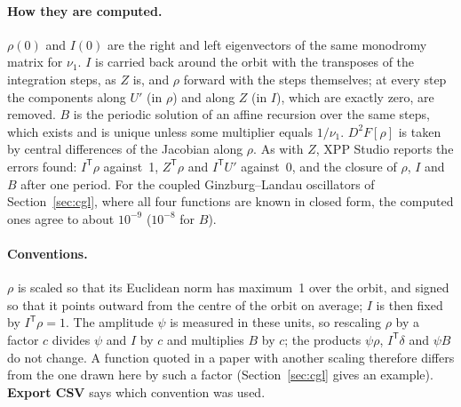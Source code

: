 \documentclass[11pt,a4paper]{article}
\newcommand{\XS}{\textsf{XPP Studio}}
\newcommand{\ui}[1]{\textsf{\textbf{#1}}}          %
\begin{document}
\paragraph{How they are computed.} $\rho(0)$ and $I(0)$ are the right and left eigenvectors of the same monodromy matrix for $\nu_1$. $I$ is carried back around the orbit with the transposes of the integration steps, as $Z$ is, and $\rho$ forward with the steps themselves; at every step the components along $U'$ (in $\rho$) and along $Z$ (in $I$), which are exactly zero, are removed. $B$ is the periodic solution of an affine recursion over the same steps, which exists and is unique unless some multiplier equals $1/\nu_1$. $D^2F[\rho]$ is taken by central differences of the Jacobian along $\rho$. As with $Z$, \XS{} reports the errors found: $I^{\mathsf T}\rho$ against~1, $Z^{\mathsf T}\rho$ and $I^{\mathsf T}U'$ against~0, and the closure of $\rho$, $I$ and $B$ after one period. For the coupled Ginzburg--Landau oscillators of Section~\ref{sec:cgl}, where all four functions are known in closed form, the computed ones agree to about $10^{-9}$ ($10^{-8}$ for $B$).

\paragraph{Conventions.} $\rho$ is scaled so that its Euclidean norm has maximum~1 over the orbit, and signed so that it points outward from the centre of the orbit on average; $I$ is then fixed by $I^{\mathsf T}\rho=1$. The amplitude $\psi$ is measured in these units, so rescaling $\rho$ by a factor $c$ divides $\psi$ and $I$ by $c$ and multiplies $B$ by $c$; the products $\psi\rho$, $I^{\mathsf T}\delta$ and $\psi B$ do not change. A function quoted in a paper with another scaling therefore differs from the one drawn here by such a factor (Section~\ref{sec:cgl} gives an example). \ui{Export CSV} says which convention was used.
\end{document}
